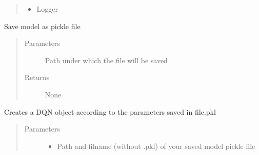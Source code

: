 \documentclass[letterpaper,10pt,english]{sphinxmanual}
\begin{document}
\begin{fulllineitems}
\begin{fulllineitems}
\begin{quote}
\begin{description}
\begin{itemize}
\item {} 
\sphinxAtStartPar
{} \textendash{} Logger

\end{itemize}

\end{description}\end{quote}

\end{fulllineitems}


\begin{fulllineitems}
\label{\detokenize{agents.reinforcement_learning:agents.reinforcement_learning.dqn.DQN.save}}
\sphinxAtStartPar
Save model as pickle file
\begin{quote}\begin{description}
\item[{Parameters}] \leavevmode
\sphinxAtStartPar
{} \textendash{} Path under which the file will be saved

\item[{Returns}] \leavevmode
\sphinxAtStartPar
None

\end{description}\end{quote}

\end{fulllineitems}


\begin{fulllineitems}
\label{\detokenize{agents.reinforcement_learning:agents.reinforcement_learning.dqn.DQN.load}}
\sphinxAtStartPar
Creates a DQN object according to the parameters saved in file.pkl
\begin{quote}\begin{description}
\item[{Parameters}] \leavevmode\begin{itemize}
\item {} 
\sphinxAtStartPar
{} \textendash{} Path and filname (without .pkl) of your saved model pickle file


\end{itemize}
\end{description}
\end{quote}
\end{fulllineitems}
\end{fulllineitems}
\end{document}
